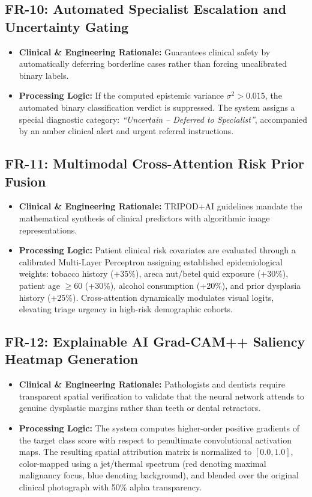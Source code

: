 \documentclass[12pt,a4paper,oneside]{report}
\begin{document}
\subsection{FR-10: Automated Specialist Escalation and Uncertainty Gating}
\begin{itemize}
    \item \textbf{Clinical \& Engineering Rationale:} Guarantees clinical safety by automatically deferring borderline cases rather than forcing uncalibrated binary labels.
    \item \textbf{Processing Logic:} If the computed epistemic variance $\sigma^2 > 0.015$, the automated binary classification verdict is suppressed. The system assigns a special diagnostic category: \textit{``Uncertain -- Deferred to Specialist''}, accompanied by an amber clinical alert and urgent referral instructions.
\end{itemize}

\subsection{FR-11: Multimodal Cross-Attention Risk Prior Fusion}
\begin{itemize}
    \item \textbf{Clinical \& Engineering Rationale:} TRIPOD+AI guidelines mandate the mathematical synthesis of clinical predictors with algorithmic image representations.
    \item \textbf{Processing Logic:} Patient clinical risk covariates are evaluated through a calibrated Multi-Layer Perceptron assigning established epidemiological weights: tobacco history (+35\%), areca nut/betel quid exposure (+30\%), patient age $\ge 60$ (+30\%), alcohol consumption (+20\%), and prior dysplasia history (+25\%). Cross-attention dynamically modulates visual logits, elevating triage urgency in high-risk demographic cohorts.
\end{itemize}

\subsection{FR-12: Explainable AI Grad-CAM++ Saliency Heatmap Generation}
\begin{itemize}
    \item \textbf{Clinical \& Engineering Rationale:} Pathologists and dentists require transparent spatial verification to validate that the neural network attends to genuine dysplastic margins rather than teeth or dental retractors.
    \item \textbf{Processing Logic:} The system computes higher-order positive gradients of the target class score with respect to penultimate convolutional activation maps. The resulting spatial attribution matrix is normalized to $[0.0, 1.0]$, color-mapped using a jet/thermal spectrum (red denoting maximal malignancy focus, blue denoting background), and blended over the original clinical photograph with 50\% alpha transparency.
\end{itemize}
\end{document}

